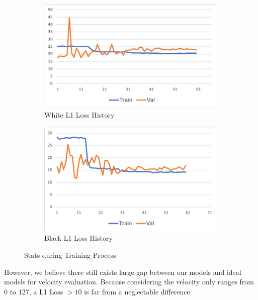 \documentclass[10pt,twocolumn,letterpaper]{article}
\begin{document}
\begin{figure}[h!]
   \begin{subfigure}{0.25\textwidth}
      \centering
      \includegraphics[width=\linewidth]{fig/vel_1.png}
      \caption{White L1 Loss History} \label{fig:k}
    \end{subfigure}\hspace*{\fill}
    \begin{subfigure}{0.25\textwidth}
      \centering
      \includegraphics[width=\linewidth]{fig/vel_3.png}
      \caption{Black L1 Loss History} \label{fig:k}
    \end{subfigure}\hspace*{\fill}
   \caption{Stats during Training Process} \label{fig:6}
\end{figure}   

However, we believe there still exists large gap between our models and ideal models for velocity evaluation. Because considering the velocity only ranges from \(0\) to \(127\), a L1 Loss \(> 10\) is far from a neglectable difference.
\end{document}
